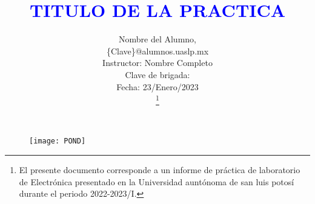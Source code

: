 \documentclass[journal]{IEEEtran}
\begin{document}
\title{\textcolor{blue}{TITULO DE LA PRACTICA}}      

\author{Nombre del Alumno,\\
		\{Clave\}@alumnos.uaslp.mx\\
		Instructor: Nombre Completo\\
        Clave de brigada:          \\
        Fecha: 23/Enero/2023\\

\thanks{El presente documento corresponde a un informe de práctica de laboratorio de Electrónica presentado en la Universidad auntónoma de san luis potosí durante el periodo 2022-2023/I.}} 



\maketitle

\begin{figure}[h!] \centering
\texttt{[image: POND]}
\end{figure}  





\ifCLASSOPTIONcaptionsoff
  \newpage
\fi


\end{document}
